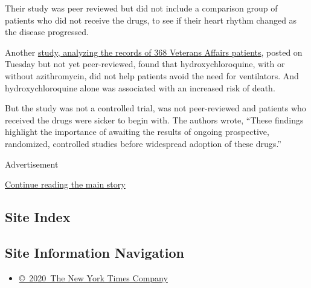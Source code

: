 Their study was peer reviewed but did not include a comparison group of
patients who did not receive the drugs, to see if their heart rhythm
changed as the disease progressed.

Another
\href{https://www.medrxiv.org/content/10.1101/2020.04.16.20065920v1}{study,
analyzing the records of 368 Veterans Affairs patients}, posted on
Tuesday but not yet peer-reviewed, found that hydroxychloroquine, with
or without azithromycin, did not help patients avoid the need for
ventilators. And hydroxychloroquine alone was associated with an
increased risk of death.

But the study was not a controlled trial, was not peer-reviewed and
patients who received the drugs were sicker to begin with. The authors
wrote, ``These findings highlight the importance of awaiting the results
of ongoing prospective, randomized, controlled studies before widespread
adoption of these drugs.''

Advertisement

\protect\hyperlink{after-bottom}{Continue reading the main story}

\hypertarget{site-index}{%
\subsection{Site Index}\label{site-index}}

\hypertarget{site-information-navigation}{%
\subsection{Site Information
Navigation}\label{site-information-navigation}}

\begin{itemize}
\tightlist
\item
  \href{https://help.nytimes3xbfgragh.onion/hc/en-us/articles/115014792127-Copyright-notice}{©~2020~The
  New York Times Company}
\end{itemize}

